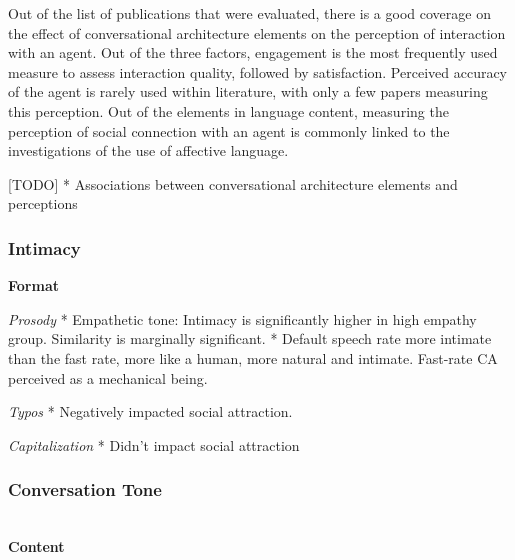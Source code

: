 \documentclass[sigconf,screen,review, anonymous]{acmart}
\newcommand{\cmt}[1]{}%
\begin{document}
Out of the list of publications that were evaluated, there is a good coverage on the effect of conversational architecture elements on the perception of interaction with an agent. Out of the three factors, engagement is the most frequently used measure to assess interaction quality, followed by satisfaction. Perceived accuracy of the agent is rarely used within literature, with only a few papers measuring this perception. Out of the elements in language content, measuring the perception of social connection with an agent is commonly linked to the investigations of the use of affective language.

[TODO] * Associations between conversational architecture elements and perceptions

\subsubsection{Intimacy \nopunct}



%


%
\textbf{Format}

\textit{Prosody}
* Empathetic tone: Intimacy is significantly higher in high empathy group. Similarity is marginally significant. \cite{kim2020can}\cmt{[24]}
* Default speech rate more intimate than the fast rate, more like a human, more natural and intimate. Fast-rate CA perceived as a mechanical being. \cite{choi2020nobody}\cmt{[54]}

\textit{Typos}
* Negatively impacted social attraction. \cite{westerman2019believe}\cmt{[9]}

\textit{Capitalization}
* Didn't impact social attraction \cite{westerman2019believe}\cmt{[9]}


\subsubsection{Conversation Tone \nopunct}
\hfill\\

\textbf{Content}
\end{document}
